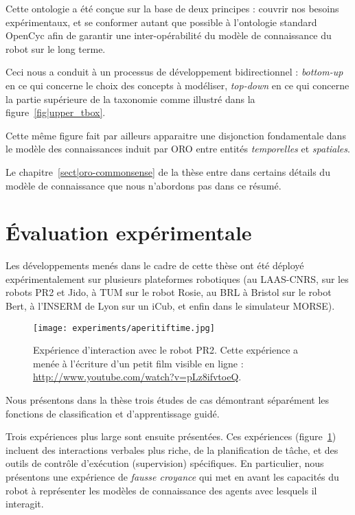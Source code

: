 Cette ontologie a été conçue sur la base de deux principes : couvrir nos
besoins expérimentaux, et se conformer autant que possible à l'ontologie
standard {\sc OpenCyc} afin de garantir une inter-opérabilité du modèle de
connaissance du robot sur le long terme.

Ceci nous a conduit à un processus de développement bidirectionnel :
\textit{bottom-up} en ce qui concerne le choix des concepts à modéliser,
\textit{top-down} en ce qui concerne la partie supérieure de la taxonomie comme
illustré dans la figure~\ref{fig|upper_tbox}.

Cette même figure fait par ailleurs apparaitre une disjonction fondamentale
dans le modèle des connaissances induit par ORO entre entités
\emph{temporelles} et \emph{spatiales}.

Le chapitre~\ref{sect|oro-commonsense} de la thèse entre dans certains détails
du modèle de connaissance que nous n'abordons pas dans ce résumé.

\section{Évaluation expérimentale}

Les développements menés dans le cadre de cette thèse ont été déployé
expérimentalement sur plusieurs plateformes robotiques (au LAAS-CNRS, sur les
robots PR2 et Jido, à TUM sur le robot Rosie, au BRL à Bristol sur le robot
Bert, à l'INSERM de Lyon sur un iCub, et enfin dans le simulateur MORSE).

\begin{figure}
    \centering
    \texttt{[image: experiments/aperitiftime.jpg]}
    \caption{Expérience d'interaction avec le robot PR2. Cette expérience a menée à l'écriture d'un petit film visible en ligne : \url{http://www.youtube.com/watch?v=pLz8ifvtoeQ}.}
    \label{fig|aperitif-video}
\end{figure}

Nous présentons dans la thèse trois études de cas démontrant séparément les
fonctions de classification et d'apprentissage guidé.

Trois expériences plus large sont ensuite présentées.  Ces expériences
(figure~\ref{fig|aperitif-video}) incluent des interactions verbales plus
riche, de la planification de tâche, et des outils de contrôle d'exécution
(supervision) spécifiques. En particulier, nous présentons une expérience de
\emph{fausse croyance} qui met en avant les capacités du robot à représenter
les modèles de connaissance des agents avec lesquels il interagit.

